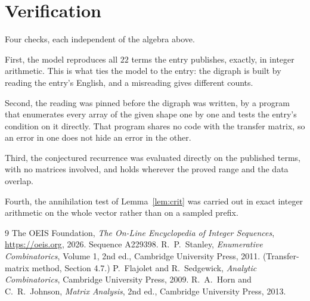 \documentclass[11pt,a4paper]{article}
\theoremstyle{plain}
\theoremstyle{definition}
\begin{document}
\section{Verification}

Four checks, each independent of the algebra above.

First, the model reproduces all $22$ terms the entry publishes, exactly, in integer
arithmetic. This is what ties the model to the entry: the digraph is built by reading the
entry's English, and a misreading gives different counts.

Second, the reading was pinned before the digraph was written, by a program that enumerates
every array of the given shape one by one and tests the entry's condition on it directly. That program shares no code with the transfer matrix, so an error in one does not
hide an error in the other.

Third, the conjectured recurrence was evaluated directly on the published terms, with no
matrices involved, and holds wherever the proved range and the data overlap.

Fourth, the annihilation test of Lemma~\ref{lem:crit} was carried out in exact integer
arithmetic on the whole vector rather than on a sampled prefix.

\begin{thebibliography}{9}
 The OEIS Foundation, \emph{The On-Line Encyclopedia of Integer
Sequences}, \url{https://oeis.org}, 2026. Sequence A229398.
 R.~P.~Stanley, \emph{Enumerative Combinatorics}, Volume 1, 2nd ed.,
Cambridge University Press, 2011. (Transfer-matrix method, Section 4.7.)
 P.~Flajolet and R.~Sedgewick, \emph{Analytic Combinatorics}, Cambridge
University Press, 2009.
 R.~A.~Horn and C.~R.~Johnson, \emph{Matrix Analysis}, 2nd ed., Cambridge
University Press, 2013.
\end{thebibliography}
\end{document}
